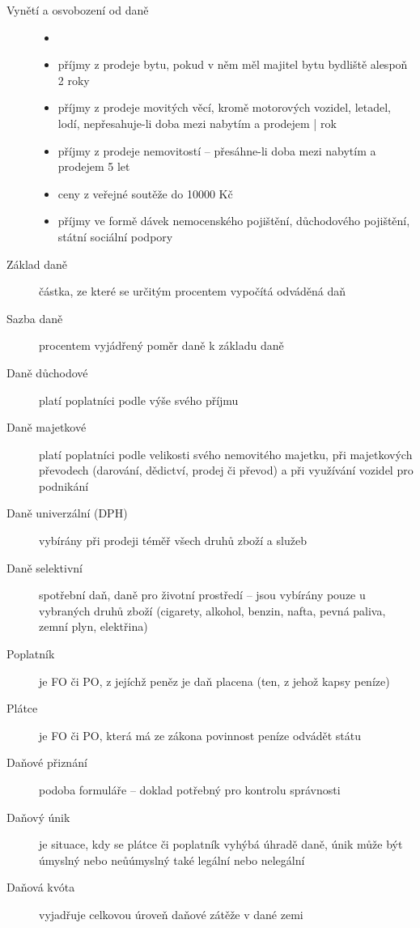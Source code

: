 \begin{description}
    \item[Vynětí a osvobození od daně]
        \begin{itemize}
            \item []
            \item příjmy z prodeje bytu, pokud v něm měl majitel bytu bydliště alespoň 2 roky
            \item příjmy z prodeje movitých věcí, kromě motorových vozidel, letadel, lodí, nepřesahuje-li doba mezi nabytím a prodejem | rok
            \item příjmy z prodeje nemovitostí -- přesáhne-li doba mezi nabytím a prodejem 5 let
            \item ceny z veřejné soutěže do 10000 Kč
            \item příjmy ve formě dávek nemocenského pojištění, důchodového pojištění, státní sociální podpory
        \end{itemize}
    \item[Základ daně] částka, ze které se určitým procentem vypočítá odváděná daň
    \item[Sazba daně] procentem vyjádřený poměr daně k základu daně
    \item[Daně důchodové] platí poplatníci podle výše svého příjmu
    \item[Daně majetkové] platí poplatníci podle velikosti svého nemovitého majetku, při majetkových převodech (darování, dědictví, prodej či převod) a při využívání vozidel pro podnikání
    \item[Daně univerzální (DPH)] vybírány při prodeji téměř všech druhů zboží a služeb
    \item[Daně selektivní] spotřební daň, daně pro životní prostředí -- jsou vybírány pouze u vybraných druhů zboží (cigarety, alkohol, benzin, nafta, pevná paliva, zemní plyn, elektřina)
    \item[Poplatník] je FO či PO, z jejíchž peněz je daň placena (ten, z jehož kapsy peníze)
    \item[Plátce] je FO či PO, která má ze zákona povinnost peníze odvádět státu
    \item[Daňové přiznání] podoba formuláře -- doklad potřebný pro kontrolu správnosti
    \item[Daňový únik] je situace, kdy se plátce či poplatník vyhýbá úhradě daně, únik může být úmyslný nebo neůúmyslný také legální nebo nelegální
    \item[Daňová kvóta] vyjadřuje celkovou úroveň daňové zátěže v dané zemi

\end{description}
